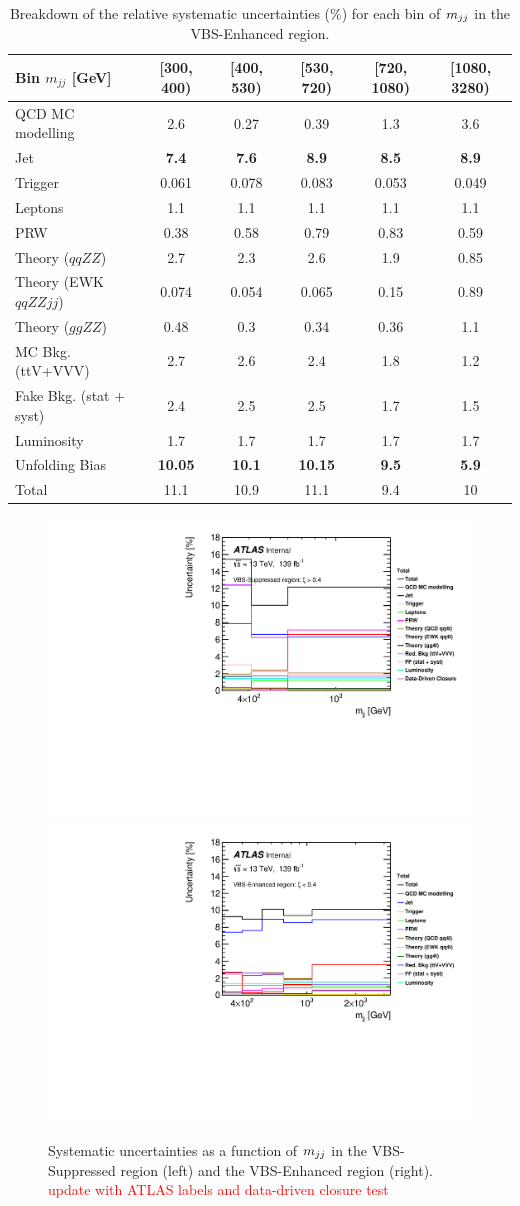 \begin{table}
\centering
\begin{tabular}{| l || c | c | c | c | c | }
\hline \hline
Bin $m_{jj}$ [GeV] & [300, 400) & [400, 530) & [530, 720) & [720, 1080) & [1080, 3280)\\
\hline
QCD MC modelling & 2.6 & 0.27 & 0.39 & 1.3 & 3.6\\
Jet & \textbf{7.4} & \textbf{7.6} & \textbf{8.9} & \textbf{8.5} & \textbf{8.9}\\
Trigger & 0.061 & 0.078 & 0.083 & 0.053 & 0.049\\
Leptons & 1.1 & 1.1 & 1.1 & 1.1 & 1.1\\
PRW & 0.38 & 0.58 & 0.79 & 0.83 & 0.59\\
Theory ($qqZZ$) & 2.7 & 2.3 & 2.6 & 1.9 & 0.85\\
Theory (EWK $qqZZjj$) & 0.074 & 0.054 & 0.065 & 0.15 & 0.89\\
Theory ($ggZZ$) & 0.48 & 0.3 & 0.34 & 0.36 & 1.1\\
MC Bkg. (ttV+VVV) & 2.7 & 2.6 & 2.4 & 1.8 & 1.2\\
Fake Bkg. (stat + syst) & 2.4 & 2.5 & 2.5 & 1.7 & 1.5\\
Luminosity & 1.7 & 1.7 & 1.7 & 1.7 & 1.7\\
Unfolding Bias & \textbf{10.05} & \textbf{10.1} & \textbf{10.15} & \textbf{9.5} & \textbf{5.9}\\
\hline
Total & 11.1 & 10.9 & 11.1 & 9.4 & 10\\
\hline
\end{tabular}
\caption{Breakdown of the relative systematic uncertainties ($\%$) for each bin of $m_{jj}$ in the VBS-Enhanced region. \label{tab:systematics_mjj_VBS_Enhanced}}
\end{table}

\begin{figure}[!htb]
\centering
\includegraphics[width=.49\linewidth]{figures/Analysis/Systematics/systematics_VBS_Suppressed.pdf}
\includegraphics[width=.49\linewidth]{figures/Analysis/Systematics/systematics_VBS_Enhanced.pdf}
\caption{Systematic uncertainties as a function of $m_{jj}$ in the VBS-Suppressed region (left) and the VBS-Enhanced region (right). \textcolor{red}{update with ATLAS labels and data-driven closure test}}  \label{fig:systematics_mjj}
\end{figure}

